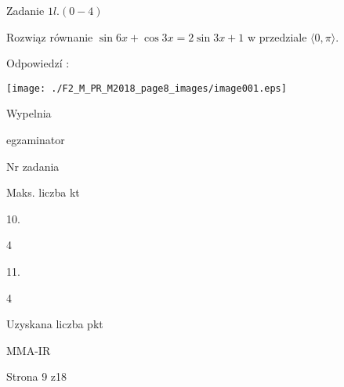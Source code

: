 \documentclass[a4paper,12pt]{article}
\begin{document}
Zadanie $1l. (0-4)$

Rozwiąz równanie $\sin 6x+\cos 3x=2\sin 3x+1$ w przedziale $\langle 0, \pi\rangle.$

Odpowiedzí :
\begin{center}
\texttt{[image: ./F2\_M\_PR\_M2018\_page8\_images/image001.eps]}
\end{center}
Wypelnia

egzaminator

Nr zadania

Maks. liczba kt

10.

4

11.

4

Uzyskana liczba pkt

MMA-IR

Strona 9 z18
\end{document}
